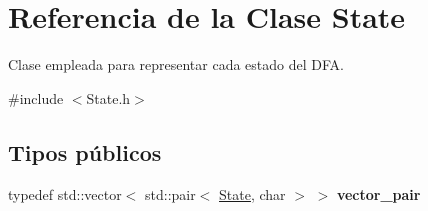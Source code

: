 \hypertarget{classState}{}\section{Referencia de la Clase State}
\label{classState}


Clase empleada para representar cada estado del D\+FA.  




{\ttfamily \#include $<$State.\+h$>$}

\subsection*{Tipos públicos}
\begin{DoxyCompactItemize}
\item 
\mbox{\label{classState_af5f8aae0de8abacc8dbbe5f5901bc3c0}} 
typedef std\+::vector$<$ std\+::pair$<$ \hyperlink{classState}{State}, char $>$ $>$ {\bfseries vector\+\_\+pair}
\end{DoxyCompactItemize}
